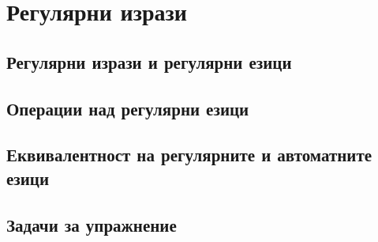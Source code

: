 \chapter{Регулярни изрази}

\section{Регулярни изрази и регулярни езици}

\section{Операции над регулярни езици}

\section{Еквивалентност на регулярните и автоматните езици}

\section{Задачи за упражнение}